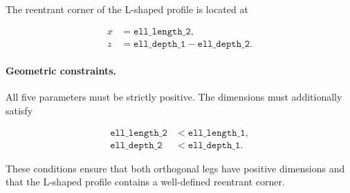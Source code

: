 The reentrant corner of the L-shaped profile
is located at

\begin{equation}
\begin{aligned}
x &= \texttt{ell\_length\_2},\\
z &= \texttt{ell\_depth\_1}
     -\texttt{ell\_depth\_2}.
\end{aligned}
\end{equation}

\paragraph{Geometric constraints.}

All five parameters must be strictly positive.
The dimensions must additionally satisfy

\begin{align}
\texttt{ell\_length\_2}
&< \texttt{ell\_length\_1},
\\
\texttt{ell\_depth\_2}
&< \texttt{ell\_depth\_1}.
\end{align}

These conditions ensure that both orthogonal
legs have positive dimensions and that
the L-shaped profile contains a well-defined
reentrant corner.
